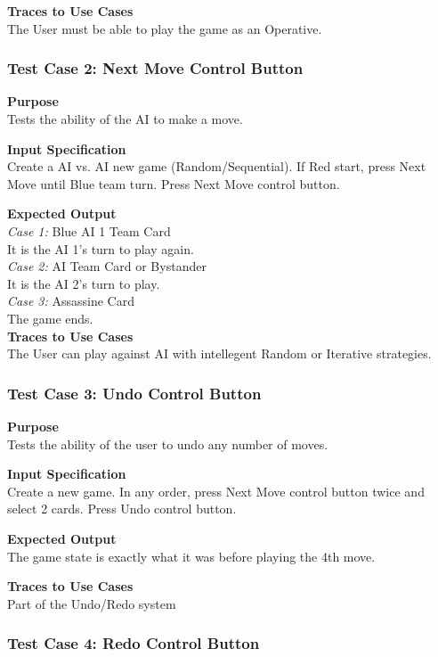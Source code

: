 \documentclass[12pt]{article}
\begin{document}
\noindent
{\bf Traces to Use Cases}\\
The User must be able to play the game as an Operative.


\subsubsection{Test Case 2: Next Move Control Button} \label{tc:2}

\noindent
{\bf Purpose}\\
Tests the ability of the AI to make a move.

\noindent
{\bf Input Specification}\\
Create a AI vs. AI new game (Random/Sequential). If Red start, press Next Move until Blue team turn. Press Next Move control button.

\noindent
{\bf Expected Output}\\
\emph{Case 1:} Blue AI 1 Team Card\\
It is the AI 1's turn to play again.\\
\emph{Case 2:} AI Team Card or Bystander\\
It is the AI 2's turn to play.\\
\emph{Case 3:} Assassine Card\\
The game ends.\\

\noindent
{\bf Traces to Use Cases}\\
The User can play against AI with intellegent Random or Iterative strategies. 


\subsubsection{Test Case 3: Undo Control Button} \label{tc:3}

\noindent
{\bf Purpose}\\
Tests the ability of the user to undo any number of moves.

\noindent
{\bf Input Specification}\\
Create a new game. In any order, press Next Move control button twice and select 2 cards. Press Undo control button.

\noindent
{\bf Expected Output}\\
The game state is exactly what it was before playing the 4th move.

\noindent
{\bf Traces to Use Cases}\\
Part of the Undo/Redo system

\subsubsection{Test Case 4: Redo Control Button } \label{tc:4}
\end{document}
